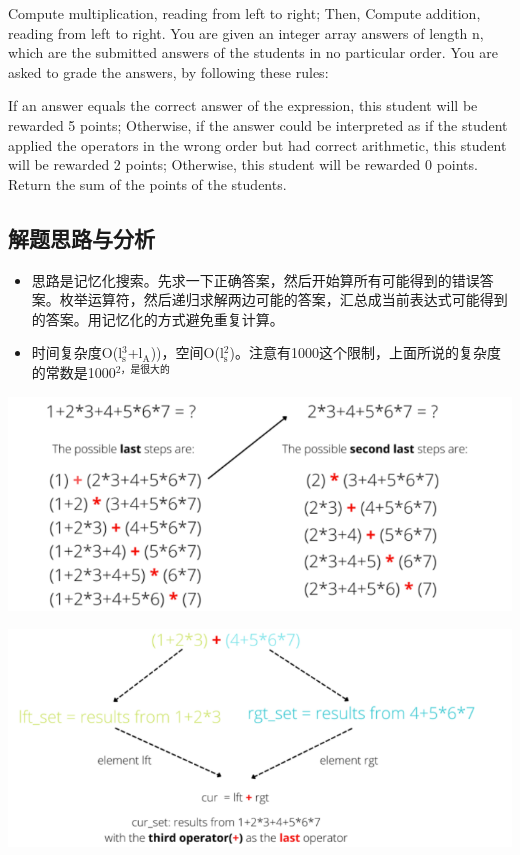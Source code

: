 \documentclass[9pt, b5paaper]{book}
\begin{document}
Compute multiplication, reading from left to right; Then,
Compute addition, reading from left to right.
You are given an integer array answers of length n, which are the submitted answers of the students in no particular order. You are asked to grade the answers, by following these rules:

If an answer equals the correct answer of the expression, this student will be rewarded 5 points;
Otherwise, if the answer could be interpreted as if the student applied the operators in the wrong order but had correct arithmetic, this student will be rewarded 2 points;
Otherwise, this student will be rewarded 0 points.
Return the sum of the points of the students.
\subsection{解题思路与分析}
\label{sec-1-5-1}
\begin{itemize}
\item 思路是记忆化搜索。先求一下正确答案，然后开始算所有可能得到的错误答案。枚举运算符，然后递归求解两边可能的答案，汇总成当前表达式可能得到的答案。用记忆化的方式避免重复计算。
\item 时间复杂度O(l$_{\text{s}}^{\text{3}}$+l$_{\text{A}}$))，空间O(l$_{\text{s}}^{\text{2}}$)。注意有1000这个限制，上面所说的复杂度的常数是1000$^{\text{2，是很大的}}$
\end{itemize}

\includegraphics[width=.9\linewidth]{./pic/score.png}

\includegraphics[width=.9\linewidth]{./pic/score2.png}
\end{document}
